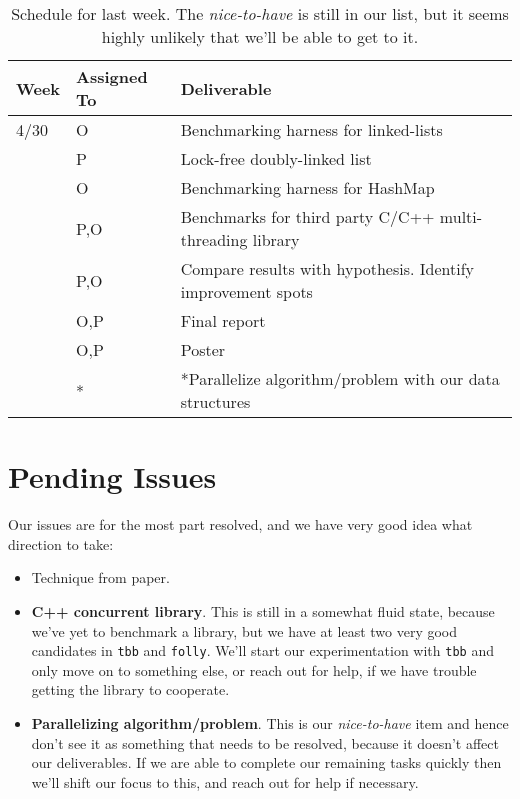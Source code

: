 \documentclass[11pt]{article}
\begin{document}
\begin{table}[t]
\begin{center}
\begin{tabular}{lll}
\toprule
\bf Week & \bf Assigned To  & \bf Deliverable   \\
\midrule
4/30     & O     & Benchmarking harness for linked-lists \\
         & P     & Lock-free doubly-linked list \\
         & O     & Benchmarking harness for HashMap \\
         & P,O   & Benchmarks for third party C/C++ multi-threading library \\
         & P,O   & Compare results with hypothesis. Identify improvement spots \\
         & O,P   & Final report \\
         & O,P   & Poster \\
         & *     & *Parallelize algorithm/problem with our data structures \\
\bottomrule
\end{tabular}
\caption{
Schedule for last week. The {\it nice-to-have} is still in our list, but it
seems highly unlikely that we'll be able to get to it.
}
\label{table:sche}
\end{center}
\end{table}

\section*{Pending Issues}
Our issues are for the most part resolved, and we have very good idea what
direction to take:

\begin{itemize}
\item
Technique from paper.
\item
{\bf C++ concurrent library}. This is still in a somewhat fluid state, because
we've yet to benchmark a library, but we have at least two very good candidates
in {\tt tbb} and {\tt folly}. We'll start our experimentation with {\tt tbb} and
only move on to something else, or reach out for help, if we have trouble
getting the library to cooperate.
\item
{\bf Parallelizing algorithm/problem}. This is our {\it nice-to-have} item and
hence don't see it as something that needs to be resolved, because it doesn't
affect our deliverables. If we are able to complete our remaining tasks quickly
then we'll shift our focus to this, and reach out for help if necessary.
\end{itemize}

\printbibliography
\end{document}
